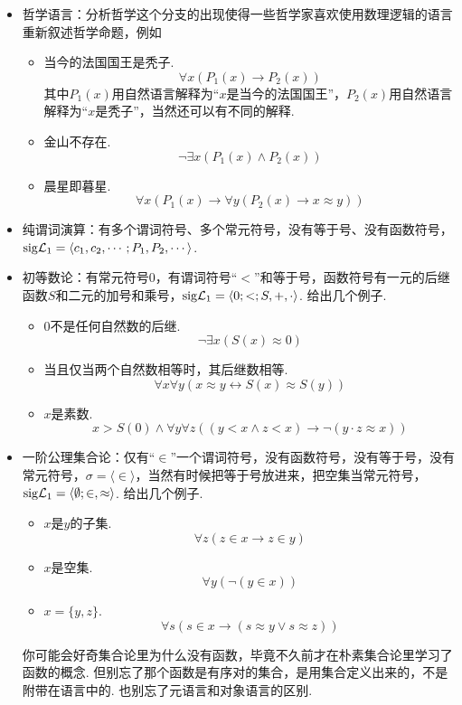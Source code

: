 \begin{itemize}
    \item 哲学语言：分析哲学这个分支的出现使得一些哲学家喜欢使用数理逻辑的语言重新叙述哲学命题，例如
    \begin{itemize}
        \item 当今的法国国王是秃子.
        \[\forall x (P_1(x) \to P_2(x))\]
        其中\(P_1(x)\)用自然语言解释为“\(x\)是当今的法国国王”，\(P_2(x)\)用自然语言解释为“\(x\)是秃子”，当然还可以有不同的解释.
        \item 金山不存在.
        \[\neg \exists x(P_1(x) \wedge P_2(x))\]
        \item 晨星即暮星.
        \[\forall x(P_1(x) \to \forall y (P_2(x) \to x \approx y))\]
    \end{itemize}
    \item 纯谓词演算：有多个谓词符号、多个常元符号，没有等于号、没有函数符号，\({\rm sig}\mathcal{L}_1 = \langle c_1, c_2, \cdots; P_1, P_2, \cdots \rangle\).
    \item 初等数论：有常元符号\(0\)，有谓词符号“\(<\)”和等于号，函数符号有一元的后继函数\(S\)和二元的加号和乘号，\({\rm sig}\mathcal{L}_1 = \langle 0; <; S, +, \cdot \rangle\). 给出几个例子.
    \begin{itemize}
        \item \(0\)不是任何自然数的后继.
        \[\neg \exists x (S(x) \approx 0)\]
        \item 当且仅当两个自然数相等时，其后继数相等.
        \[\forall x \forall y(x \approx y \leftrightarrow S(x) \approx S(y))\]
        \item \(x\)是素数.
        \[x > S(0) \wedge \forall y \forall z ((y < x \wedge z < x) \to \neg(y \cdot z \approx x)) \]
    \end{itemize}
    \item 一阶公理集合论：仅有“\(\in\)”一个谓词符号，没有函数符号，没有等于号，没有常元符号，\(\sigma = \langle \in \rangle\)，当然有时候把等于号放进来，把空集当常元符号，\({\rm sig}\mathcal{L}_1 = \langle \emptyset; \in, \approx \rangle\). 给出几个例子.
    \begin{itemize}
        \item \(x\)是\(y\)的子集.
        \[\forall z (z \in x \to z \in y)\]
        \item \(x\)是空集.
        \[\forall y (\neg (y \in x))\]
        \item \(x=\{y,z\}\).
        \[\forall s(s \in x \to (s \approx y \vee s \approx z))\]
    \end{itemize}
    你可能会好奇集合论里为什么没有函数，毕竟不久前才在朴素集合论里学习了函数的概念. 但别忘了那个函数是有序对的集合，是用集合定义出来的，不是附带在语言中的. 也别忘了元语言和对象语言的区别. 
\end{itemize}


